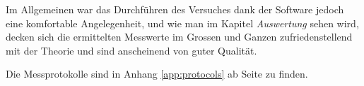 Im Allgemeinen  war das Durchf\"uhren  des Versuches dank der  Software jedoch
eine  komfortable  Angelegenheit, und  wie  man  im Kapitel  \emph{Auswertung}
sehen  wird, decken  sich  die  ermittelten Messwerte  im  Grossen und  Ganzen
zufriedenstellend mit der Theorie und sind anscheinend von guter Qualit\"at.

Die   Messprotokolle    sind   in   Anhang   \ref{app:protocols}    ab   Seite
\pageref{app:protocols} zu finden.
